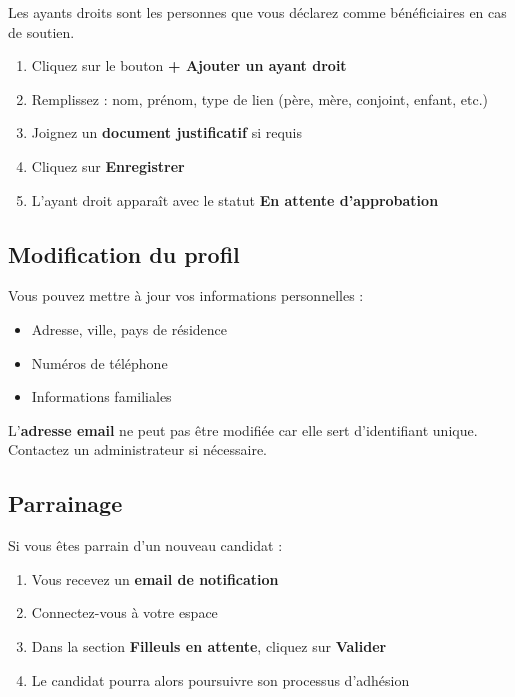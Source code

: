 \documentclass[12pt,a4paper]{article}
\begin{document}
Les ayants droits sont les personnes que vous déclarez comme bénéficiaires en cas de soutien.

\begin{etapebox}
\begin{enumerate}[leftmargin=1.5em]
    \item Cliquez sur le bouton \textbf{+ Ajouter un ayant droit}
    \item Remplissez : nom, prénom, type de lien (père, mère, conjoint, enfant, etc.)
    \item Joignez un \textbf{document justificatif} si requis
    \item Cliquez sur \textbf{Enregistrer}
    \item L'ayant droit apparaît avec le statut \textbf{En attente d'approbation}
\end{enumerate}
\end{etapebox}

\subsection{Modification du profil}

Vous pouvez mettre à jour vos informations personnelles :
\begin{itemize}
    \item Adresse, ville, pays de résidence
    \item Numéros de téléphone
    \item Informations familiales
\end{itemize}

\begin{attentionbox}[Attention]
L'\textbf{adresse email} ne peut pas être modifiée car elle sert d'identifiant unique. Contactez un administrateur si nécessaire.
\end{attentionbox}

\subsection{Parrainage}

Si vous êtes parrain d'un nouveau candidat :
\begin{enumerate}
    \item Vous recevez un \textbf{email de notification}
    \item Connectez-vous à votre espace
    \item Dans la section \textbf{Filleuls en attente}, cliquez sur \textbf{Valider}
    \item Le candidat pourra alors poursuivre son processus d'adhésion
\end{enumerate}
\end{document}
